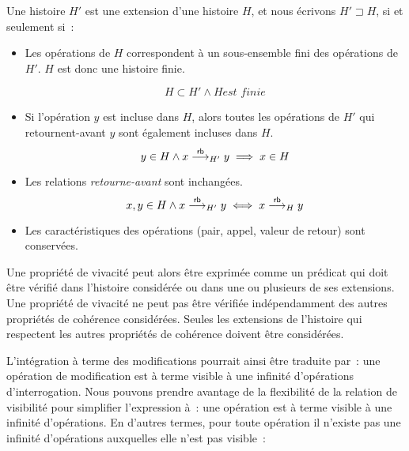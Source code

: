 \begin{definition}\label{def:hist-ext}
Une histoire $H'$ est une extension d'une histoire $H$, et nous écrivons $H' \sqsupset H$, si et seulement si~:
\begin{itemize}
    \item Les opérations de $H$ correspondent à un sous-ensemble fini des opérations de $H'$. $H$ est donc une histoire finie.

    \begin{equation*}
    H \subset H' \land H \textit{est finie}
    \end{equation*}

    \item Si l'opération $y$ est incluse dans $H$, alors toutes les opérations de $H'$ qui retournent-avant $y$ sont également incluses dans $H$.
    \begin{equation*}
    y \in H \land x \overset{\mathsf{rb}}{\longrightarrow}_{H'} y \implies x \in H
    \end{equation*}
    
    \item Les relations \emph{retourne-avant} sont inchangées.
    \begin{equation*}
    x, y \in H \land x \overset{\mathsf{rb}}{\longrightarrow}_{H'} y \iff x \overset{\mathsf{rb}}{\longrightarrow}_{H} y
    \end{equation*}
    
    \item Les caractéristiques des opérations (pair, appel, valeur de retour) sont conservées.
\end{itemize}
\end{definition}

Une propriété de vivacité peut alors être exprimée comme un prédicat qui doit être vérifié dans l'histoire considérée ou dans une ou plusieurs de ses extensions.
Une propriété de vivacité ne peut pas être vérifiée indépendamment des autres propriétés de cohérence considérées.
Seules les extensions de l'histoire qui respectent les autres propriétés de cohérence doivent être considérées.

L'intégration à terme des modifications pourrait ainsi être traduite par~: une opération de modification est à terme visible à une infinité d'opérations d'interrogation.
Nous pouvons prendre avantage de la flexibilité de la relation de visibilité pour simplifier l'expression à~: une opération est à terme visible à une infinité d'opérations.
En d'autres termes, pour toute opération il n'existe pas une infinité d'opérations auxquelles elle n'est pas visible~:

